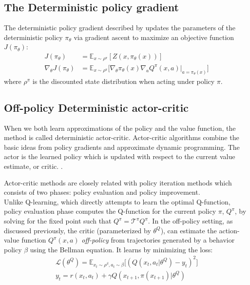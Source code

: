 \subsection{The Deterministic policy gradient}
The deterministic policy gradient described by \citet{silver2014b} updates the parameters of the
deterministic policy $\pi_\theta$ via gradient ascent to maximize an objective function $J(\pi_\theta)$:
\begin{align}
    J(\pi_\theta) &=  \mathbb E_{x \sim \rho^\pi} [Z(x,\pi_\theta(x))]\\
    \nabla_\theta J(\pi_\theta) &=  \mathbb E_{x \sim \rho^\pi} 
    \big [\nabla_{\theta} \pi_\theta(x) \nabla_a Q^{\pi}(x,a)|_{a=\pi_\theta(x)}  \big]
\end{align} 
where $\rho^\pi$ is the discounted state distribution when acting under policy $\pi$.


\subsection{Off-policy Deterministic actor-critic} \label{subsec:offpolicy_actor_critic}
When we both learn approximations of the policy and the value function, the method is called deterministic actor-critic.
Actor-critic algorithms combine the basic ideas from policy gradients and approximate dynamic programming.
The actor is the learned policy which is updated with respect to the current value estimate, or critic.
\cite{Sutton1998}.

Actor-critic methods are closely related with policy iteration methods \citep{Lagoudakis2004}
which consists of two phases: policy evaluation and policy improvement. \\
Unlike Q-learning, which directly attempts to learn the optimal Q-function, policy evaluation
phase computes the Q-function for the current policy $\pi$, $Q^\pi$, by solving
for the fixed point such that $Q^\pi=\mathcal{T}^\pi Q^\pi$.
In the off-policy setting, as discussed previously, the critic (parameterized by $\theta^Q$), can estimate the 
action-value function $Q^{\pi}(x,a)$ \textit{off-policy}  from
trajectories generated by a behavior policy $\beta$
using the Bellman equation.
It learns by minimizing the loss:
\begin{align}
    \mathcal{L}(\theta^Q) = \mathbb E_{x_t\sim \rho^\beta, a_t\sim \beta} \Big[ (Q(x_t,a_t| \theta^Q)-y_t)^2          \Big] \nonumber\\ 
    y_t = r(x_t,a_t) + \gamma Q(x_{t+1},\pi(x_{t+1})| \theta^Q) \label{eq:bellman_loss}
\end{align}


